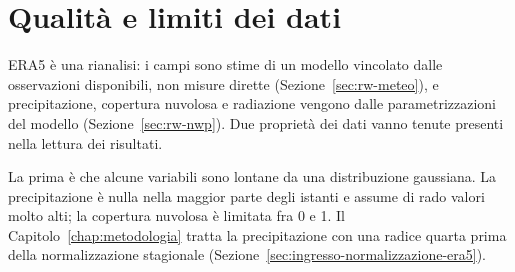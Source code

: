\section{Qualità e limiti dei dati}
\label{sec:dati-limiti}

ERA5 è una rianalisi: i campi sono stime di un modello vincolato dalle osservazioni disponibili, non misure dirette (Sezione~\ref{sec:rw-meteo}), e precipitazione, copertura nuvolosa e radiazione vengono dalle parametrizzazioni del modello (Sezione~\ref{sec:rw-nwp}). Due proprietà dei dati vanno tenute presenti nella lettura dei risultati.

La prima è che alcune variabili sono lontane da una distribuzione gaussiana. La precipitazione è nulla nella maggior parte degli istanti e assume di rado valori molto alti; la copertura nuvolosa è limitata fra 0 e 1. Il Capitolo~\ref{chap:metodologia} tratta la precipitazione con una radice quarta prima della normalizzazione stagionale (Sezione~\ref{sec:ingresso-normalizzazione-era5}).

